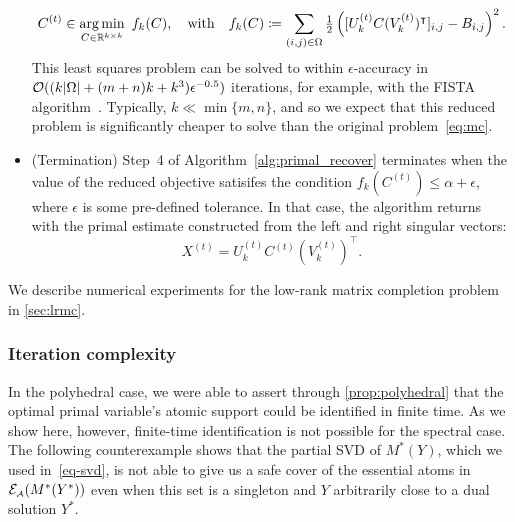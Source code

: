 \begin{example}
\begin{itemize}
\begin{equation}
          C^{(t)} \in \underset{C\in\mathbb{R}^{k\times k}}{\textrm{arg}\,{\min}}\enskip f_k(C),
          \hbox{\quad with\quad}
          f_k(C) \coloneqq \sum_{(i,j) \in \Omega}  \tfrac{1}{2}\left([U_k^{(t)}C(V_k^{(t)})^\intercal]_{i,j} - B_{i,j}\right)^2. 
      \end{equation}
      This least squares problem can be solved to within $\epsilon$-accuracy in $\mathcal{O}(( k |\Omega| + (m+n)k + k^3 )\epsilon^{-0.5})$ iterations, for example, with the FISTA algorithm~\cite{beck2009fast}. Typically, $k \ll \min\{m,n\}$, and so we expect that this reduced problem is significantly cheaper to solve than the original problem~\eqref{eq:mc}.
      \item (Termination) Step~4 of Algorithm~\ref{alg:primal_recover} terminates when the value of the reduced objective satisifes the condition $f_k(C^{(t)}) \leq \alpha + \epsilon$, where $\epsilon$ is some pre-defined tolerance. In that case, the algorithm returns with the primal estimate constructed from the left and right singular vectors:
      \[X^{(t)} = U_k^{(t)}C^{(t)}(V_k^{(t)})^\intercal.\]
  \end{itemize}
  We describe numerical experiments for the low-rank matrix completion problem in \autoref{sec:lrmc}. 
\end{example}

\subsubsection{Iteration complexity}

In the polyhedral case, we were able to assert through \autoref{prop:polyhedral} that the optimal primal variable's atomic support could be identified in finite time. As we show here, however, finite-time identification is not possible for the spectral case. The following counterexample shows that the partial SVD of $M^*(Y)$, which we used in~\eqref{eq-svd}, is not able to give us a safe cover of the essential atoms in $\mathcal{E}_{\scriptscriptstyle\mathcal{A}}(M^*(Y^*))$ even when this set is a singleton and $Y$ arbitrarily close to a dual solution $Y^*$.

